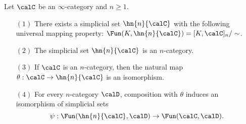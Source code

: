 \begin{proposition}\label{undern}
Let $\calC$ be an $\infty$-category and $n \geq 1$.
\begin{itemize}
\item[$(1)$] There exists a simplicial set $\hn{n}{\calC}$ with the following universal mapping property: $\Fun(K, \hn{n}{ \calC}) = [K, \calC]_{n} / \sim$.
\item[$(2)$] The simplicial set $\hn{n}{\calC}$ is an $n$-category.
\item[$(3)$] If $\calC$ is an $n$-category, then the natural map $\theta: \calC \rightarrow \hn{n}{\calC}$ is an isomorphism.
\item[$(4)$] For every $n$-category $\calD$, composition with $\theta$ induces an isomorphism of simplicial sets
$$ \psi: \Fun( \hn{n}{\calC}, \calD) \rightarrow \Fun( \calC, \calD). $$
\end{itemize}
\end{proposition}

